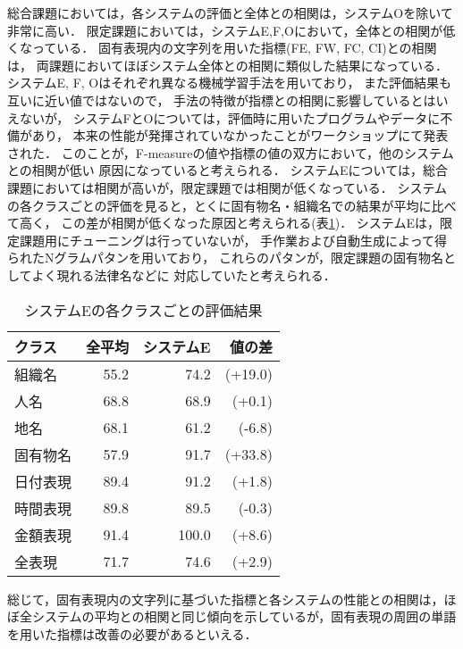 総合課題においては，各システムの評価と全体との相関は，システムOを除いて非常に高い．
限定課題においては，システムE,F,Oにおいて，全体との相関が低くなっている．
固有表現内の文字列を用いた指標(FE, FW, FC, CI)との相関は，
両課題においてほぼシステム全体との相関に類似した結果になっている．
システムE, F, Oはそれぞれ異なる機械学習手法を用いており，
また評価結果も互いに近い値ではないので，
手法の特徴が指標との相関に影響しているとはいえないが，
システムFとOについては，評価時に用いたプログラムやデータに不備があり，
本来の性能が発揮されていなかったことがワークショップにて発表された．
このことが，F-measureの値や指標の値の双方において，他のシステムとの相関が低い
原因になっていると考えられる．
システムEについては，総合課題においては相関が高いが，限定課題では相関が低くなっている．
システムの各クラスごとの評価を見ると，とくに固有物名・組織名での結果が平均に比べて高く，
この差が相関が低くなった原因と考えられる(表\ref{table:system_E})．
システムEは，限定課題用にチューニングは行っていないが，
手作業および自動生成によって得られたNグラムパタンを用いており，
これらのパタンが，限定課題の固有物名としてよく現れる法律名などに
対応していたと考えられる．

\begin{table}
\begin{center}
\caption{システムEの各クラスごとの評価結果}
\label{table:system_E}
\begin{tabular}{l|rrr} \hline
クラス   & 全平均 & システムE & 値の差  \\ \hline
組織名   & 55.2   & 74.2      & (+19.0) \\       
人名     & 68.8   & 68.9      & (+0.1)  \\       
地名     & 68.1   & 61.2      & (-6.8)  \\       
固有物名 & 57.9   & 91.7      & (+33.8) \\       
日付表現 & 89.4   & 91.2      & (+1.8)  \\       
時間表現 & 89.8   & 89.5      & (-0.3)  \\       
金額表現 & 91.4   & 100.0     & (+8.6)  \\ \hline
全表現   & 71.7   & 74.6      & (+2.9)  \\ \hline 
\end{tabular}	  
\end{center}
\end{table}

総じて，固有表現内の文字列に基づいた指標と各システムの性能との相関は，ほ
ぼ全システムの平均との相関と同じ傾向を示しているが，固有表現の周囲の単語
を用いた指標は改善の必要があるといえる．

